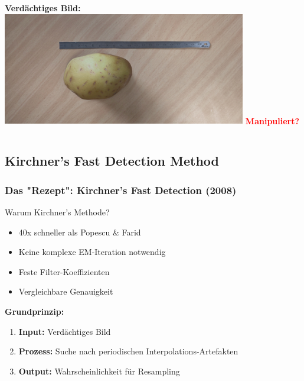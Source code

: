 \documentclass[11pt,t,usepdftitle=false,aspectratio=169]{beamer}
\begin{document}
\begin{frame}
\begin{columns}[T]
\begin{column}{0.4\textwidth}
			\textbf{Verdächtiges Bild:}
			\vspace{0.3em}
			\includegraphics[width=0.8\textwidth]{images/image_2_s.jpg}
			\vspace{0.2em}
			\textcolor{red}{\textbf{Manipuliert?}}
		\end{column}
	\end{columns}
\end{frame}


\subsection{Kirchner's Fast Detection Method}

\begin{frame}
	\frametitle{Das "Rezept": Kirchner's Fast Detection (2008)}
	
	\begin{exampleblock}{Warum Kirchner's Methode?}
		\begin{itemize}
			\item 40x schneller als Popescu \& Farid~\cite{popescu_exposing_2005}
			\item Keine komplexe EM-Iteration notwendig
			\item Feste Filter-Koeffizienten
			\item Vergleichbare Genauigkeit
		\end{itemize}
	\end{exampleblock}
	
	\vspace{0.5em}
	
	\textbf{Grundprinzip:}
	\begin{enumerate}
		\item \textbf{Input:} Verdächtiges Bild
		\item \textbf{Prozess:} Suche nach periodischen Interpolations-Artefakten
		\item \textbf{Output:} Wahrscheinlichkeit für Resampling
	\end{enumerate}
\end{frame}
\end{document}
